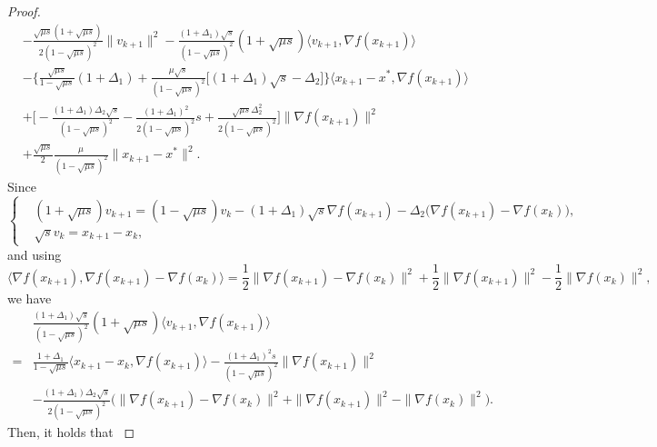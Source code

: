 \documentclass[10pt,a4paper]{amsart}
\begin{document}
\begin{proof}
{\begin{align*}
        &-\frac{\sqrt{\mu s}(1+\sqrt{\mu s})}{2(1-\sqrt{\mu s})^2}\|v_{k+1}\|^2
        -\frac{(1+\Delta_1)\sqrt{s}}{(1-\sqrt{\mu s})^2}(1+\sqrt{\mu s})\langle v_{k+1},\nabla f(x_{k+1})\rangle\\
        &-\Big\{\frac{\sqrt{\mu s}}{1-\sqrt{\mu s}}(1+\Delta_1)+\frac{\mu\sqrt{s}}{(1-\sqrt{\mu s})^2}\big[(1+\Delta_1)\sqrt{s}-\Delta_2\big]\Big\}\langle x_{k+1}-x^*,\nabla f(x_{k+1})\rangle\\
        &+\big[-\frac{(1+\Delta_1)\Delta_2\sqrt{s}}{(1-\sqrt{\mu s})^2}-\frac{(1+\Delta_1)^2}{2(1-\sqrt{\mu s})^2}s+\frac{\sqrt{\mu s}\Delta_2^2}{2(1-\sqrt{\mu s})^2}\big]\|\nabla f(x_{k+1})\|^2\\
        &+\frac{\sqrt{\mu s}}{2}\frac{\mu}{(1-\sqrt{\mu s})^2}\|x_{k+1}-x^*\|^2.
        \end{align*}
        Since
        \begin{equation*}
        \left\{
        \begin{aligned}
        & (1+\sqrt{\mu s})v_{k+1}=(1-\sqrt{\mu s})v_k-(1+\Delta_1)\sqrt{s}\nabla f(x_{k+1})-\Delta_2\big(\nabla f(x_{k+1})-\nabla f(x_k)\big),\\
        & \sqrt{s}v_k=x_{k+1}-x_k,
        \end{aligned}
        \right. 
        \end{equation*}
        and using
        \begin{equation*}
	\langle \nabla     
        f(x_{k+1}),\nabla f(x_{k+1})-\nabla f(x_k)\rangle=\frac{1}{2}\|\nabla f(x_{k+1})-\nabla f(x_k)\|^2+\frac{1}{2}\|\nabla f(x_{k+1})\|^2-\frac{1}{2}\|\nabla f(x_k)\|^2,
	\end{equation*}
        we have
        \begin{align*}
            &\frac{(1+\Delta_1)\sqrt{s}}{(1-\sqrt{\mu s})^2}(1+\sqrt{\mu s})\langle v_{k+1}, \nabla f(x_{k+1}) \rangle\\
            =&\frac{1+\Delta_1}{1-\sqrt{\mu s}}\langle x_{k+1}-x_k,\nabla f(x_{k+1}) \rangle - \frac{(1+\Delta_1)^2s}{(1-\sqrt{\mu s})^2}\|\nabla f(x_{k+1})\|^2\\
            &-\frac{(1+\Delta_1)\Delta_2\sqrt{s}}{2(1-\sqrt{\mu s})^2}\big(\|\nabla f(x_{k+1})-\nabla f(x_k)\|^2+\|\nabla f(x_{k+1})\|^2-\|\nabla f(x_k)\|^2\big).
        \end{align*}
        Then, it holds that  
}
\end{proof}
\end{document}
